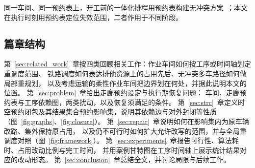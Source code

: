 \documentclass[manuscript,screen,review]{acmart}
\begin{document}
同一车间、同一预约表上，开工前的一体化排程用预约表构建无冲突方案~\cite{vanos2026exact,li2026framework,sun2023integrated}；本文在执行时刻用预约表定位失效范围，二者作用于不同阶段。

\subsection{篇章结构}

第~\ref{sec:related_work}~章按四类回顾相关工作：作业车间如何按工序或时间轴划定重调度范围、
铁路调度如何表达排他资源上的占用先后、无冲突多车路径如何做局部重规划，
以及考虑运输的柔性作业车间把边界划在何处，并据此说明本文的位置。
第~\ref{sec:problem}~章给出走廊预约设定与执行期恢复问题：
车间、走廊预约表与工序依赖图，两类扰动，以及恢复须满足的条件。
第~\ref{sec:strc}~章定义时空预约闭包及其结果集合预约影响集，说明其依赖边与对外封闭等性质
（图~\ref{fig:graphs}、\ref{fig:closure}）。
第~\ref{sec:repair}~章说明如何在影响集内为原车辆改路、集外保持原占用，
以及仍不可行时如何扩大允许改写的范围，并与全局重调度对照（图~\ref{fig:framework}）。
第~\ref{sec:experiments}~章报告可行性、算法耗时、占用改动比例与完工时间，
并用案例甘特图在工序时间轴上展示统计结果对应的改动形态。
第~\ref{sec:conclusion}~章总结全文，并讨论局限与后续工作。
\end{document}
